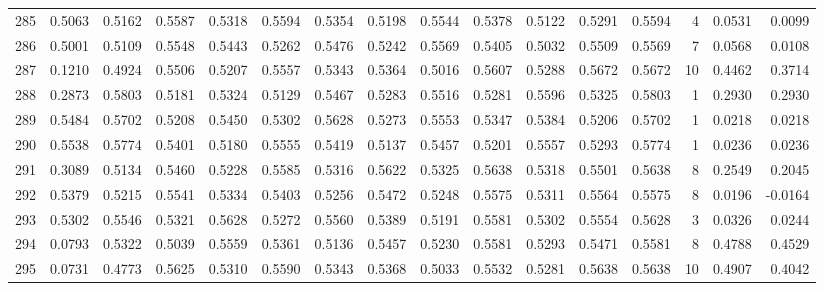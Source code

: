 \begin{tabular}{lrrrrrrrrrrrrrrr}
285 &      0.5063 &  0.5162 &  0.5587 &  0.5318 &  0.5594 &  0.5354 &  0.5198 &  0.5544 &  0.5378 &  0.5122 &   0.5291 &     0.5594 &      4 &                    0.0531 &                     0.0099 \\
286 &      0.5001 &  0.5109 &  0.5548 &  0.5443 &  0.5262 &  0.5476 &  0.5242 &  0.5569 &  0.5405 &  0.5032 &   0.5509 &     0.5569 &      7 &                    0.0568 &                     0.0108 \\
287 &      0.1210 &  0.4924 &  0.5506 &  0.5207 &  0.5557 &  0.5343 &  0.5364 &  0.5016 &  0.5607 &  0.5288 &   0.5672 &     0.5672 &     10 &                    0.4462 &                     0.3714 \\
288 &      0.2873 &  0.5803 &  0.5181 &  0.5324 &  0.5129 &  0.5467 &  0.5283 &  0.5516 &  0.5281 &  0.5596 &   0.5325 &     0.5803 &      1 &                    0.2930 &                     0.2930 \\
289 &      0.5484 &  0.5702 &  0.5208 &  0.5450 &  0.5302 &  0.5628 &  0.5273 &  0.5553 &  0.5347 &  0.5384 &   0.5206 &     0.5702 &      1 &                    0.0218 &                     0.0218 \\
290 &      0.5538 &  0.5774 &  0.5401 &  0.5180 &  0.5555 &  0.5419 &  0.5137 &  0.5457 &  0.5201 &  0.5557 &   0.5293 &     0.5774 &      1 &                    0.0236 &                     0.0236 \\
291 &      0.3089 &  0.5134 &  0.5460 &  0.5228 &  0.5585 &  0.5316 &  0.5622 &  0.5325 &  0.5638 &  0.5318 &   0.5501 &     0.5638 &      8 &                    0.2549 &                     0.2045 \\
292 &      0.5379 &  0.5215 &  0.5541 &  0.5334 &  0.5403 &  0.5256 &  0.5472 &  0.5248 &  0.5575 &  0.5311 &   0.5564 &     0.5575 &      8 &                    0.0196 &                    -0.0164 \\
293 &      0.5302 &  0.5546 &  0.5321 &  0.5628 &  0.5272 &  0.5560 &  0.5389 &  0.5191 &  0.5581 &  0.5302 &   0.5554 &     0.5628 &      3 &                    0.0326 &                     0.0244 \\
294 &      0.0793 &  0.5322 &  0.5039 &  0.5559 &  0.5361 &  0.5136 &  0.5457 &  0.5230 &  0.5581 &  0.5293 &   0.5471 &     0.5581 &      8 &                    0.4788 &                     0.4529 \\
295 &      0.0731 &  0.4773 &  0.5625 &  0.5310 &  0.5590 &  0.5343 &  0.5368 &  0.5033 &  0.5532 &  0.5281 &   0.5638 &     0.5638 &     10 &                    0.4907 &                     0.4042 \\

\end{tabular}
